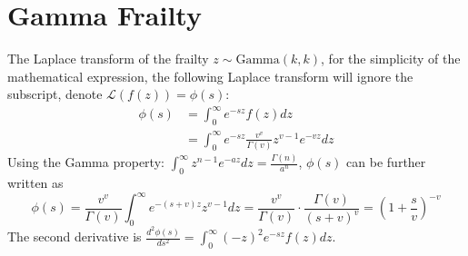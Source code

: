 \documentclass[preprint,12pt]{elsarticle}
\begin{document}
\section{Gamma Frailty} 
The Laplace transform of the frailty $z\sim\text{Gamma}(k, k)$, for the simplicity of the mathematical expression, the following Laplace transform will ignore the subscript, denote $\mathscr{L}(f(z))=\phi(s)$:
\begin{align}
    \phi(s)&=\int_0^{\infty}e^{-sz}f(z)dz\\
    &=\int_0^{\infty}e^{-sz}\frac{v^v}{\Gamma(v)}z^{v-1}e^{-vz}dz
\end{align}
Using the Gamma property: $\int_0^{\infty}z^{n-1}e^{-az}dz=\frac{\Gamma(n)}{a^n}$, $\phi(s)$ can be further written as
\begin{equation}
    \phi(s)=\frac{v^v}{\Gamma(v)}\int_0^{\infty}e^{-(s+v)z}z^{v-1}dz=\frac{v^v}{\Gamma(v)}\cdot \frac{\Gamma(v)}{(s+v)^v}=(1+\frac{s}{v})^{-v}
\end{equation}
The second derivative is $\frac{d^2\phi(s)}{ds^2}=\int_0^{\infty}(-z)^2e^{-sz}f(z)dz$. 
\end{document}

